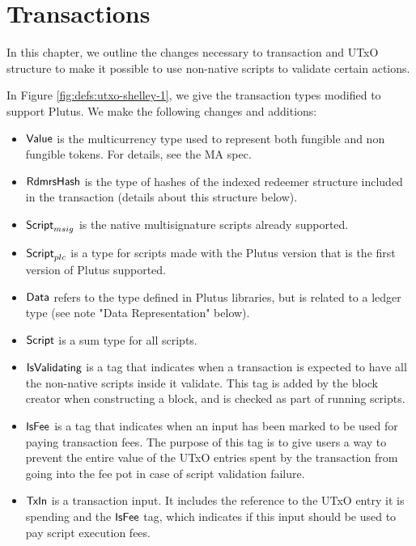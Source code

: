 \section{Transactions}
\label{sec:transactions}

In this chapter, we outline the changes necessary to transaction and
UTxO structure to make it possible to use non-native scripts to validate
certain actions.

In Figure \ref{fig:defs:utxo-shelley-1}, we give the transaction types modified
to support Plutus.
We make the following changes and additions:

\begin{itemize}
  \item $\mathsf{Value}$ is the multicurrency type used to represent
  both fungible and non fungible tokens. For details, see the MA spec.

  \item $\mathsf{RdmrsHash}$ is the type of hashes of the indexed redeemer structure
  included in the transaction (details about this structure below).

  \item $\mathsf{Script}_{msig}$ is the native multisignature scripts already supported.

  \item $\mathsf{Script}_{plc}$ is a type for scripts made with the Plutus version
  that is the first version of Plutus supported.

  \item $\mathsf{Data}$ refers to the type defined in Plutus libraries, but is
  related to a ledger type (see note "Data Representation" below).

  \item $\mathsf{Script}$ is a sum type for all scripts.
  
  \item $\mathsf{IsValidating}$ is a tag that indicates when a transaction is
  expected to have all the non-native scripts inside it validate.
  This tag is added by the block creator when
  constructing a block, and is checked as part of running scripts.

  \item $\mathsf{IsFee}$ is a tag that indicates when an input has been marked
  to be used for paying transaction fees.
  The purpose of this tag is to give users a way to prevent
  the entire value of the UTxO entries spent by the transaction
  from going into the fee pot in case of script validation failure.
  
  \item $\mathsf{TxIn}$ is a transaction input. It includes the reference to the UTxO entry it is spending
  and the $\mathsf{IsFee}$ tag, which indicates if this input should
  be used to pay script execution fees.


\end{itemize}
